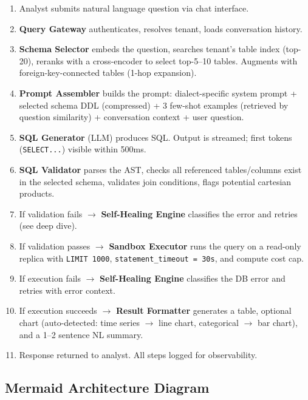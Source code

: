 \begin{enumerate}
  \item Analyst submits natural language question via chat interface.
  \item \textbf{Query Gateway} authenticates, resolves tenant, loads conversation history.
  \item \textbf{Schema Selector} embeds the question, searches tenant's table index (top-20), reranks with a cross-encoder to select top-5--10 tables. Augments with foreign-key-connected tables (1-hop expansion).
  \item \textbf{Prompt Assembler} builds the prompt: dialect-specific system prompt + selected schema DDL (compressed) + 3 few-shot examples (retrieved by question similarity) + conversation context + user question.
  \item \textbf{SQL Generator} (LLM) produces SQL. Output is streamed; first tokens (\texttt{SELECT...}) visible within 500ms.
  \item \textbf{SQL Validator} parses the AST, checks all referenced tables/columns exist in the selected schema, validates join conditions, flags potential cartesian products.
  \item If validation fails $\rightarrow$ \textbf{Self-Healing Engine} classifies the error and retries (see deep dive).
  \item If validation passes $\rightarrow$ \textbf{Sandbox Executor} runs the query on a read-only replica with \texttt{LIMIT 1000}, \texttt{statement\_timeout = 30s}, and compute cost cap.
  \item If execution fails $\rightarrow$ \textbf{Self-Healing Engine} classifies the DB error and retries with error context.
  \item If execution succeeds $\rightarrow$ \textbf{Result Formatter} generates a table, optional chart (auto-detected: time series $\rightarrow$ line chart, categorical $\rightarrow$ bar chart), and a 1--2 sentence NL summary.
  \item Response returned to analyst. All steps logged for observability.
\end{enumerate}

\subsection*{Mermaid Architecture Diagram}

